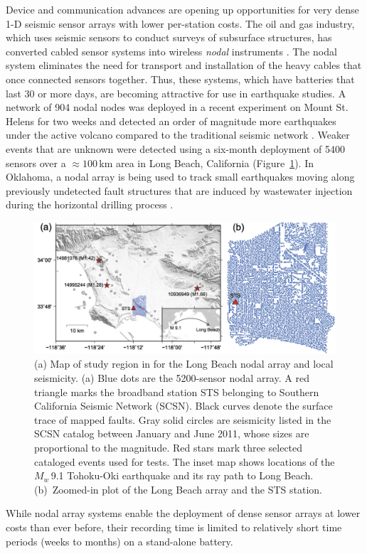 \documentclass{article}
\begin{document}
Device and communication advances are opening up opportunities for very dense 1-D seismic sensor arrays with lower per-station costs.
The oil and gas industry, which uses seismic sensors to conduct surveys of subsurface structures, has converted cabled sensor systems into wireless \emph{nodal} instruments \autocite{slater2012california}.
The nodal system eliminates the need for transport and installation of the heavy cables that once connected sensors together.
Thus, these systems, which have batteries that last 30 or more days, are becoming attractive for use in earthquake studies.
A network of 904 nodal nodes was deployed in a recent experiment on Mount St. Helens for two weeks and detected an order of magnitude more earthquakes under the active volcano compared to the traditional seismic network \autocite{hansen2015automated}.
Weaker events that are unknown were detected using a six-month deployment of 5400 sensors over a $\approx100$\,km area in Long Beach, California \autocite{li2018high} (Figure~\ref{fig:nodal_array}).
In Oklahoma, a nodal array is being used to track small earthquakes moving along previously undetected fault structures that are induced by wastewater injection during the horizontal drilling process \autocite{sweet2018community,dougherty2017large}.
%
\begin{figure}
    \centering
    \includegraphics[width=\linewidth]{nodal_array}
    \caption{(a) Map of study region in \textcite{li2018high} for the Long Beach nodal array and local seismicity. (a) Blue dots are the 5200-sensor nodal array. A red triangle marks the broadband station STS belonging to Southern California Seismic Network (SCSN). Black curves denote the surface trace of mapped faults. Gray solid circles are seismicity listed in the SCSN catalog between January and June 2011, whose sizes are proportional to the magnitude. Red stars mark three selected cataloged events used for tests. The inset map shows locations of the $M_w$\,9.1 Tohoku-Oki earthquake and its ray path to Long Beach. (b)~Zoomed-in plot of the Long Beach array and the STS station. }
    \label{fig:nodal_array}
\end{figure}
%
While nodal array systems enable the deployment of dense sensor arrays at lower costs than ever before, their recording time is limited to relatively short time periods (weeks to months) on a stand-alone battery.
\end{document}
